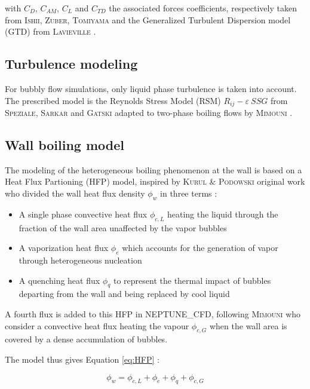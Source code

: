 with $C_{D}$, $C_{AM}$, $C_{L}$ and $C_{TD}$ the associated forces coefficients, respectively taken from \textsc{Ishii}\cite{Ishii1967}, \textsc{Zuber}\cite{Zuber1964}, \textsc{Tomiyama}\cite{Tomiyama2002} and the Generalized Turbulent Dispersion model (GTD) from \textsc{Lavieville} \etal \cite{Lavieville2017}.

\subsection{Turbulence modeling}
\label{subsec:turbulence}

For bubbly flow simulations, only liquid phase turbulence is taken into account. The prescribed model is the Reynolds Stress Model (RSM) $R_{ij}-\varepsilon~SSG$ from \textsc{Speziale}, \textsc{Sarkar} and \textsc{Gatski}\cite{Speziale1991} adapted to two-phase boiling flows by \textsc{Mimouni} \etal\cite{Mimouni2011}.

\subsection{Wall boiling model}
\label{subsec:HFP}

The modeling of the heterogeneous boiling phenomenon at the wall is based on a Heat Flux Partioning (HFP) model, inspired by \textsc{Kurul} \& \textsc{Podowski} original work\cite{Kurul1990} who divided the wall heat flux density $\phi_{w}$ in three terms  :

\begin{itemize}
\item A single phase convective heat flux $\phi_{c,L}$ heating the liquid through the fraction of the wall area unaffected by the vapor bubbles
\item A vaporization heat flux $\phi_{e}$ which accounts for the generation of vapor through heterogeneous nucleation
\item A quenching heat flux $\phi_{q}$ to represent the thermal impact of bubbles departing from the wall and being replaced by cool liquid
\end{itemize}

A fourth flux is added to this HFP in NEPTUNE\_CFD, following \textsc{Mimouni} \etal\cite{Mimouni2016} who consider a convective heat flux heating the vapour $\phi_{c,G}$ when the wall area is covered by a dense accumulation of bubbles.

The model thus gives Equation \ref{eq:HFP} :

\begin{equation}
\label{eq:HFP}
\phi_{w}=\phi_{c,L}+\phi_{e}+\phi_{q}+\phi_{c,G}
\end{equation}

